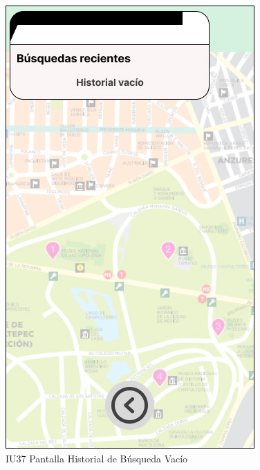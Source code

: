 \begin{figure}[h]
    \begin{minipage}{0.5\textwidth}
        \centering
        \includegraphics[width=.7\linewidth]{Pantallas Prototipo3/IU37-Historial de Búsqueda Vacío.jpg}
        \caption{IU37 Pantalla Historial de Búsqueda Vacío}
    \end{minipage}
    

\end{figure}
